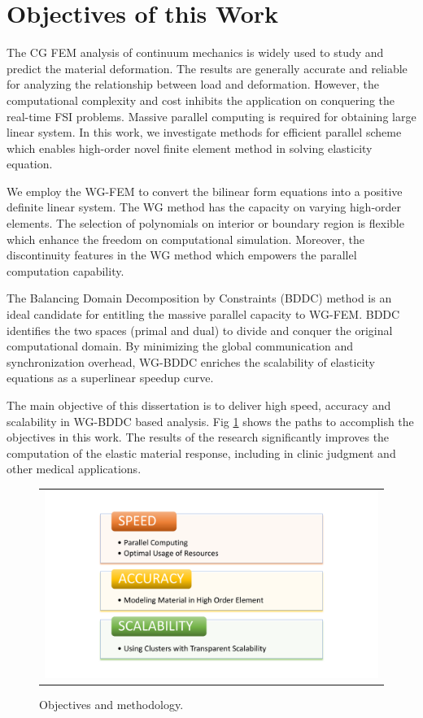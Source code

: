 \section{Objectives of this Work}

The CG FEM analysis of continuum mechanics is widely used to study and predict the material deformation. The results are generally accurate and reliable for analyzing the relationship between load and deformation. However, the computational complexity and cost inhibits the application on conquering the real-time FSI problems. Massive parallel computing is required for obtaining large linear system. In this work, we investigate methods for efficient parallel scheme which enables high-order novel finite element method in solving elasticity equation.

We employ the WG-FEM to convert the bilinear form equations into a positive definite linear system. The WG method has the capacity on varying high-order elements. The selection of polynomials on interior or boundary region is flexible which enhance the freedom on computational simulation. Moreover, the discontinuity features in the WG method which empowers the parallel computation capability.

The Balancing Domain Decomposition by Constraints (BDDC) method is an ideal candidate for entitling the massive parallel capacity to WG-FEM. BDDC identifies the two spaces (primal and dual) to divide and conquer the original computational domain. By minimizing the global communication and synchronization overhead,  WG-BDDC enriches the scalability of elasticity equations as a superlinear speedup curve.

The main objective of this dissertation is to deliver high speed, accuracy and scalability in WG-BDDC based analysis. Fig \ref{fig: ch1p4} shows the paths to accomplish the objectives in this work. The results of the research significantly improves the computation of the elastic material response, including in clinic judgment and other medical applications.

\begin{figure}[H]
	\centering
	\begin{tabular}{c}
		\includegraphics[width=1.0\textwidth]{./pics/ch1p4}
	\end{tabular}
	\caption{\footnotesize Objectives and methodology.} \label{fig: ch1p4}
\end{figure}

